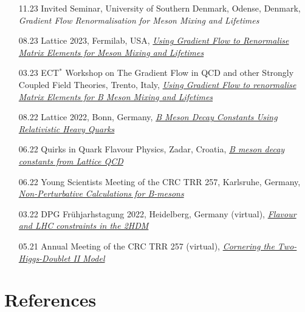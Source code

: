 \documentclass[10pt]{article} %
\begin{document}
\begin{paracol}{2}
\begin{itemize}[noitemsep,topsep=1pt,label=]
    \item [11.23] Invited Seminar, University of Southern Denmark, Odense, Denmark, {\it\color{linkcolor} Gradient Flow Renormalisation for Meson Mixing and Lifetimes}
    \item [08.23] Lattice 2023, Fermilab, USA, \href{https://indico.fnal.gov/event/57249/contributions/268344/}{\it Using Gradient Flow to Renormalise Matrix Elements for Meson Mixing and Lifetimes}
    \item [03.23] ECT$^*$ Workshop on The Gradient Flow in QCD and other Strongly Coupled Field Theories, Trento, Italy, \href{https://indico.ectstar.eu/event/164/contributions/3524/}{\it Using Gradient Flow to renormalise Matrix Elements for B Meson Mixing and Lifetimes}
    \item [08.22] Lattice 2022, Bonn, Germany, \href{https://indico.hiskp.uni-bonn.de/event/40/contributions/680/}{\it B Meson Decay Constants Using Relativistic Heavy Quarks}
    \item [06.22] Quirks in Quark Flavour Physics, Zadar, Croatia, \href{https://indico.ph.tum.de/event/6994/contributions/5251/}{\it B meson decay constants from Lattice QCD}
    \item [06.22] Young Scientists Meeting of the CRC TRR 257, Karlsruhe, Germany, \href{https://indico.scc.kit.edu/event/2690/contributions/10446/}{\it Non-Perturbative Calculations for B-mesons}
    \item [03.22] DPG Fr\"uhjarhstagung 2022, Heidelberg, Germany (virtual), \href{https://www.dpg-verhandlungen.de/year/2022/conference/heidelberg/part/t/session/85/contribution/2}{\it Flavour and LHC constraints in the 2HDM}
    \item [05.21] Annual Meeting of the CRC TRR 257 (virtual), \href{https://indico.scc.kit.edu/event/2365/contributions/8675/attachments/4243/6353/Black.pdf}{\it Cornering the Two-Higgs-Doublet II Model}
\end{itemize}

\pagebreak

\section{References}



\end{paracol}
\end{document}
